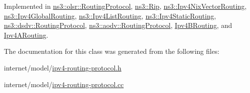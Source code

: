Implemented in \hyperlink{classns3_1_1olsr_1_1RoutingProtocol_ab0e32a7ea7f5198133eaacca3b4c12da}{ns3\+::olsr\+::\+Routing\+Protocol}, \hyperlink{classns3_1_1Rip_abe2906af2196cf9fac033e6ccfde0423}{ns3\+::\+Rip}, \hyperlink{classns3_1_1Ipv4NixVectorRouting_aff290a5e6590fb40ef8de74abfeebc74}{ns3\+::\+Ipv4\+Nix\+Vector\+Routing}, \hyperlink{classns3_1_1Ipv4GlobalRouting_a48499c4690b5699fd12aade2e236f214}{ns3\+::\+Ipv4\+Global\+Routing}, \hyperlink{classns3_1_1Ipv4ListRouting_a62155135e9c49583a9e71f3ad503e6b2}{ns3\+::\+Ipv4\+List\+Routing}, \hyperlink{classns3_1_1Ipv4StaticRouting_a3caec935381a858c42583d2d023d4499}{ns3\+::\+Ipv4\+Static\+Routing}, \hyperlink{classns3_1_1dsdv_1_1RoutingProtocol_aab88c62fbd0567cf31d185cb58b23a44}{ns3\+::dsdv\+::\+Routing\+Protocol}, \hyperlink{classns3_1_1aodv_1_1RoutingProtocol_a34df0b3e287abea45d48ab7c8162e183}{ns3\+::aodv\+::\+Routing\+Protocol}, \hyperlink{classIpv4BRouting_aa374c6adeaedb07efb307bc4540f7754}{Ipv4\+B\+Routing}, and \hyperlink{classIpv4ARouting_af5adcc0186259a1d3f46bc12efd62f3b}{Ipv4\+A\+Routing}.



The documentation for this class was generated from the following files\+:\begin{DoxyCompactItemize}
\item 
internet/model/\hyperlink{ipv4-routing-protocol_8h}{ipv4-\/routing-\/protocol.\+h}\item 
internet/model/\hyperlink{ipv4-routing-protocol_8cc}{ipv4-\/routing-\/protocol.\+cc}\end{DoxyCompactItemize}

